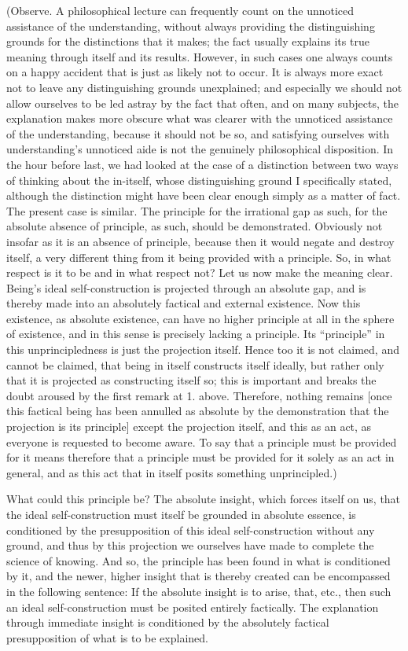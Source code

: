 (Observe. A philosophical lecture can frequently count on
the unnoticed assistance of the understanding,
without always providing the distinguishing grounds
for the distinctions that it makes;
the fact usually explains its true meaning
through itself and its results.
However, in such cases one always counts on
a happy accident that is just as likely not to occur.
It is always more exact not to leave
any distinguishing grounds unexplained;
and especially we should not allow ourselves
to be led astray by the fact that often, and on many subjects,
the explanation makes more obscure what was clearer
with the unnoticed assistance of the understanding,
because it should not be so, and satisfying ourselves
with understanding's unnoticed aide is not
the genuinely philosophical disposition.
In the hour before last, we had looked at the case of
a distinction between two ways of thinking about the in-itself,
whose distinguishing ground I specifically stated,
although the distinction might have been clear enough
simply as a matter of fact.
The present case is similar.
The principle for the irrational gap as such,
for the absolute absence of principle, as such,
should be demonstrated.
Obviously not insofar as it is an absence of principle,
because then it would negate and destroy itself,
a very different thing from it being provided with a principle.
So, in what respect is it to be and in what respect not?
Let us now make the meaning clear.
Being's ideal self-construction is projected through an absolute gap,
and is thereby made into an absolutely factical and external existence.
Now this existence, as absolute existence, can have no higher
principle at all in the sphere of existence,
and in this sense is precisely lacking a principle.
Its “principle” in this unprincipledness is just the projection itself.
Hence too it is not claimed, and cannot be claimed,
that being in itself constructs itself ideally,
but rather only that it is projected as constructing itself so;
this is important and breaks the doubt
aroused by the first remark at 1. above.
Therefore, nothing remains
[once this factical being has been annulled as absolute
by the demonstration that the projection is its principle]
except the projection itself, and this as an act,
as everyone is requested to become aware.
To say that a principle must be provided for it means therefore
that a principle must be provided for it solely as an act in general,
and as this act that in itself posits something unprincipled.)

What could this principle be?
The absolute insight, which forces itself on us,
that the ideal self-construction must
itself be grounded in absolute essence,
is conditioned by the presupposition of
this ideal self-construction without any ground,
and thus by this projection
we ourselves have made to complete
the science of knowing.
And so, the principle has been found in
what is conditioned by it,
and the newer, higher insight
that is thereby created can be
encompassed in the following sentence:
If the absolute insight is to arise, that, etc.,
then such an ideal self-construction
must be posited entirely factically.
The explanation through immediate insight is
conditioned by the absolutely factical
presupposition of what is to be explained.

